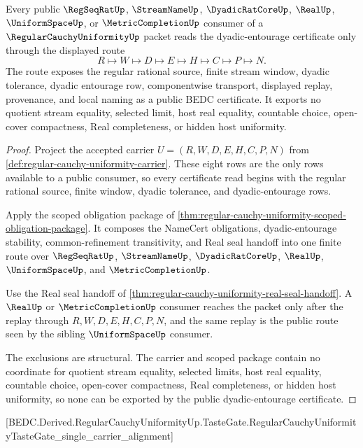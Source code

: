 \begin{theorem}
\label{thm:regular-cauchy-uniformity-public-certificate}
Every public $\RegSeqRatUp$, $\StreamNameUp$, $\DyadicRatCoreUp$, $\RealUp$, $\UniformSpaceUp$, or $\MetricCompletionUp$ consumer of a $\RegularCauchyUniformityUp$ packet reads the dyadic-entourage certificate only through the displayed route
$$
R \longmapsto W \longmapsto D \longmapsto E \longmapsto H \longmapsto C \longmapsto P \longmapsto N .
$$
The route exposes the regular rational source, finite stream window, dyadic tolerance, dyadic entourage row, componentwise transport, displayed replay, provenance, and local naming as a public BEDC certificate. It exports no quotient stream equality, selected limit, host real equality, countable choice, open-cover compactness, Real completeness, or hidden host uniformity.
\end{theorem}
\begin{proof}
Project the accepted carrier $U=(R,W,D,E,H,C,P,N)$ from \autoref{def:regular-cauchy-uniformity-carrier}. These eight rows are the only rows available to a public consumer, so every certificate read begins with the regular rational source, finite window, dyadic tolerance, and dyadic-entourage rows.

Apply the scoped obligation package of \autoref{thm:regular-cauchy-uniformity-scoped-obligation-package}. It composes the NameCert obligations, dyadic-entourage stability, common-refinement transitivity, and Real seal handoff into one finite route over $\RegSeqRatUp$, $\StreamNameUp$, $\DyadicRatCoreUp$, $\RealUp$, $\UniformSpaceUp$, and $\MetricCompletionUp$.

Use the Real seal handoff of \autoref{thm:regular-cauchy-uniformity-real-seal-handoff}. A $\RealUp$ or $\MetricCompletionUp$ consumer reaches the packet only after the replay through $R,W,D,E,H,C,P,N$, and the same replay is the public route seen by the sibling $\UniformSpaceUp$ consumer.

The exclusions are structural. The carrier and scoped package contain no coordinate for quotient stream equality, selected limits, host real equality, countable choice, open-cover compactness, Real completeness, or hidden host uniformity, so none can be exported by the public dyadic-entourage certificate.
\end{proof}

[BEDC.Derived.RegularCauchyUniformityUp.TasteGate.RegularCauchyUniformityTasteGate\_single\_carrier\_alignment]


